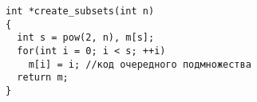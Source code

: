 \documentclass[a5paper]{article}
\begin{document}
\begin{lstlisting}
int *create_subsets(int n)
{
  int s = pow(2, n), m[s];
  for(int i = 0; i < s; ++i)
    m[i] = i; //код очередного подмножества
  return m;
}
\end{lstlisting}
\end{document}
